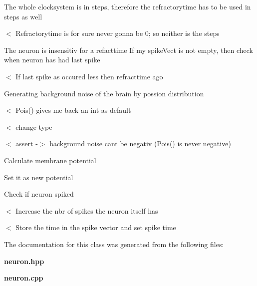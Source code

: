 The whole clocksystem is in steps, therefore the refractorytime has to be used in steps as well

$<$ Refractorytime is for sure never gonna be 0; so neither is the steps

The neuron is insensitiv for a refacttime If my spike\+Vect is not empty, then check when neuron has had last spike

$<$ If last spike as occured less then refracttime ago

Generating background noise of the brain by possion distribution

$<$ Pois() gives me back an int as default

$<$ change type

$<$ assert -\/$>$ background noise can\textquotesingle{}t be negativ (Pois() is never negative)

Calculate membrane potential

Set it as new potential

Check if neuron spiked

$<$ Increase the nbr of spikes the neuron itself has

$<$ Store the time in the spike vector and set spike time 

The documentation for this class was generated from the following files\+:\begin{DoxyCompactItemize}
\item 
\textbf{ neuron.\+hpp}\item 
\textbf{ neuron.\+cpp}\end{DoxyCompactItemize}
